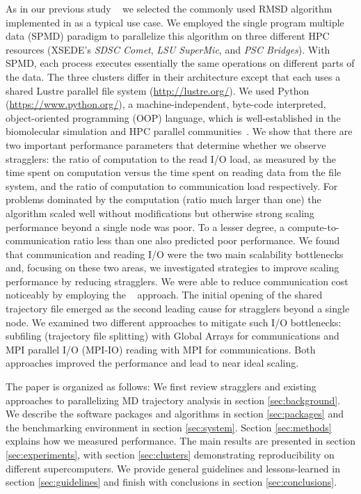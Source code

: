 As in our previous study ~\cite{Khoshlessan:2017ab} we selected the commonly used RMSD algorithm implemented in  as a typical use case.
We employed the single program multiple data (SPMD) paradigm to parallelize this algorithm on three different HPC resources (XSEDE's \emph{SDSC Comet}, \emph{LSU SuperMic}, and \emph{PSC Bridges}).
With SPMD, each process executes essentially the same operations on different parts of the data.
The three clusters differ in their architecture except that each uses a shared Lustre parallel file system (\url{http://lustre.org/}).
We used Python (\url{https://www.python.org/}), a machine-independent, byte-code interpreted, object-oriented programming (OOP) language, which is well-established in the biomolecular simulation and HPC parallel communities~\cite{Dalcin:2011aa, GAiN}. 
We show that there are two important performance parameters that determine whether we observe stragglers: the ratio of computation to the read I/O load, as measured by the time spent on computation versus the time spent on reading data from the file system, and the ratio of computation to communication load respectively.
For problems dominated by the computation (ratio much larger than one) the algorithm scaled well without modifications but otherwise strong scaling performance beyond a single node was poor.
To a lesser degree, a compute-to-communication ratio less than one also predicted poor performance.
We found that communication and reading I/O were the two main scalability bottlenecks and, focusing on these two areas, we investigated strategies to improve scaling performance by reducing stragglers. 
We were able to reduce communication cost noticeably by employing the ~\cite{GA, GAiN} approach.
The initial opening of the shared trajectory file emerged as the second leading cause for stragglers beyond a single node.
We examined two different approaches to mitigate such I/O bottlenecks: subfiling (trajectory file splitting) with Global Arrays for communications and MPI parallel I/O (MPI-IO) reading with MPI for communications.
Both approaches improved the performance and lead to near ideal scaling.

The paper is organized as follows:
We first review stragglers and existing approaches to parallelizing MD trajectory analysis in section \ref{sec:background}.
We describe the software packages and algorithms in section \ref{sec:packages} and the benchmarking environment in section \ref{sec:system}.
Section \ref{sec:methods} explains how we measured performance.
The main results are presented in section \ref{sec:experiments}, with section \ref{sec:clusters} demonstrating reproducibility on different supercomputers.
We provide general guidelines and lessons-learned in section \ref{sec:guidelines} and finish with conclusions in section \ref{sec:conclusions}.
